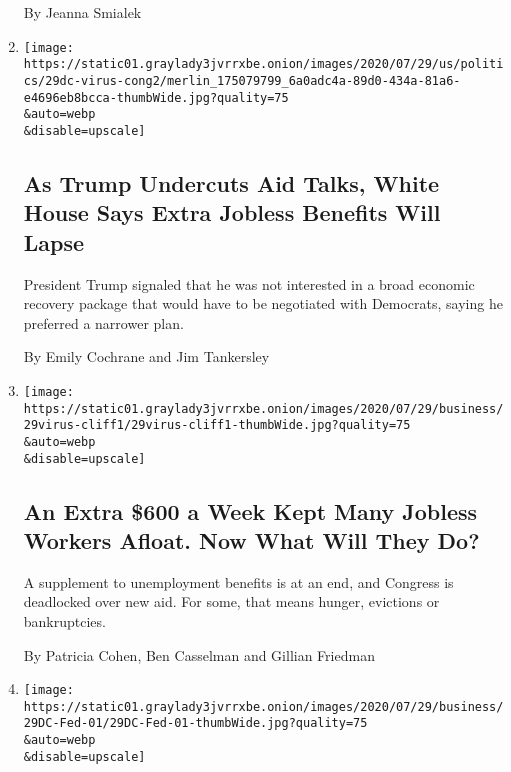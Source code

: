 \begin{enumerate}
  By Jeanna Smialek
\item
  \href{/2020/07/29/business/economy/virus-aid-trump.html}{}

  \texttt{[image: https://static01.graylady3jvrrxbe.onion/images/2020/07/29/us/politics/29dc-virus-cong2/merlin\_175079799\_6a0adc4a-89d0-434a-81a6-e4696eb8bcca-thumbWide.jpg?quality=75\\\&auto=webp\\\&disable=upscale]}

  \hypertarget{as-trump-undercuts-aid-talks-white-house-says-extra-jobless-benefits-will-lapse}{%
  \subsection{As Trump Undercuts Aid Talks, White House Says Extra
  Jobless Benefits Will
  Lapse}\label{as-trump-undercuts-aid-talks-white-house-says-extra-jobless-benefits-will-lapse}}

  President Trump signaled that he was not interested in a broad
  economic recovery package that would have to be negotiated with
  Democrats, saying he preferred a narrower plan.

  By Emily Cochrane and Jim Tankersley
\item
  \href{/2020/07/29/business/economy/unemployment-benefits-coronavirus.html}{}

  \texttt{[image: https://static01.graylady3jvrrxbe.onion/images/2020/07/29/business/29virus-cliff1/29virus-cliff1-thumbWide.jpg?quality=75\\\&auto=webp\\\&disable=upscale]}

  \hypertarget{an-extra-600-a-week-kept-many-jobless-workers-afloat-now-what-will-they-do}{%
  \subsection{An Extra \$600 a Week Kept Many Jobless Workers Afloat.
  Now What Will They
  Do?}\label{an-extra-600-a-week-kept-many-jobless-workers-afloat-now-what-will-they-do}}

  A supplement to unemployment benefits is at an end, and Congress is
  deadlocked over new aid. For some, that means hunger, evictions or
  bankruptcies.

  By Patricia Cohen, Ben Casselman and Gillian Friedman
\item
  \href{/2020/07/29/business/economy/federal-reserve-meeting-interest-rates.html}{}

  \texttt{[image: https://static01.graylady3jvrrxbe.onion/images/2020/07/29/business/29DC-Fed-01/29DC-Fed-01-thumbWide.jpg?quality=75\\\&auto=webp\\\&disable=upscale]}


\end{enumerate}
